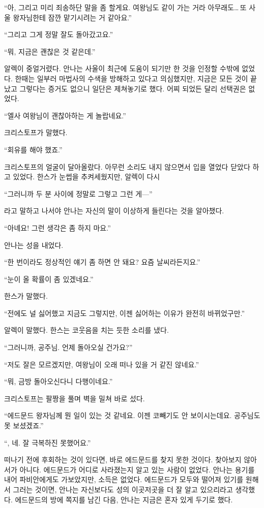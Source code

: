 ``아, 그리고 미리 죄송하단 말을 좀 할게요. 여왕님도 같이 가는 거라 아무래도\ldots\,또 사울 왕자님한테 잠깐 맡기시려는 거 같아요.''

``그리고 그게 정말 잘도 돌아갔고요.''

``뭐, 지금은 괜찮은 것 같은데.''

알렉이 중얼거렸다. 안나는 사울이 최근에 도움이 되기만 한 것을 인정할 수밖에 없었다. 한때는 일부러 마법사의 수색을 방해하고 있다고 의심했지만, 지금은 모든 것이 끝났고 그렇다는 증거도 없으니 일단은 제쳐놓기로 했다. 어찌 되었든 달리 선택권은 없었다.

``엘사 여왕님이 괜찮아하는 게 놀랍네요.''

크리스토프가 말했다.

`` 회유를 해야 했죠.''

크리스토프의 얼굴이 달아올랐다. 아무런 소리도 내지 않으면서 입을 열었다 닫았다 하고 있었다. 한스가 눈썹을 추켜세웠지만, 알렉이 다시

``그러니까 두 분 사이에 정말로 그렇고 그런 게—''

라고 말하고 나서야 안나는 자신의 말이 이상하게 들린다는 것을 알아챘다.

``아녜요! 그런 생각은 좀 하지 마요.''

안나는 성을 내었다.

``한 번이라도 정상적인 얘기 좀 하면 안 돼요? 요즘 날씨라든지요.''

``눈이 올 확률이 좀 있겠네요.''

한스가 말했다.

``전에도 널 싫어했고 지금도 그렇지만, 이젠 싫어하는 이유가 완전히 바뀌었구만.''

알렉이 말했다. 한스는 코웃음을 치는 듯한 소리를 냈다.

``그러니까, 공주님. 언제 돌아오실 건가요?''

``저도 잘은 모르겠지만, 여왕님이 오래 떠나 있을 거 같진 않네요.''

``뭐, 금방 돌아오신다니 다행이네요.''

크리스토프는 팔짱을 풀며 벽을 밀쳐 바로 섰다.

``에드문드 왕자님께 뭔 일이 있는 것 같네요. 이젠 코빼기도 안 보이시는데요. 공주님도 못 보셨겠죠.''

``, 네. 잘 극복하진 못했어요.''

떠나기 전에 후회하는 것이 있다면, 바로 에드문드를 찾지 못한 것이다. 찾아보지 않아서가 아니다. 에드문드가 어디로 사라졌는지 알고 있는 사람이 없었다. 안나는 용기를 내어 파비안에게도 가보았지만, 소득은 없었다. 에드문드가 모두와 떨어져 있기를 원해서 그러는 것이면, 안나는 자신보다도 성의 이곳저곳을 더 잘 알고 있으리라고 생각했다. 에드문드의 방에 쪽지를 남긴 다음, 안나는 지금은 혼자 있게 두기로 했다.

